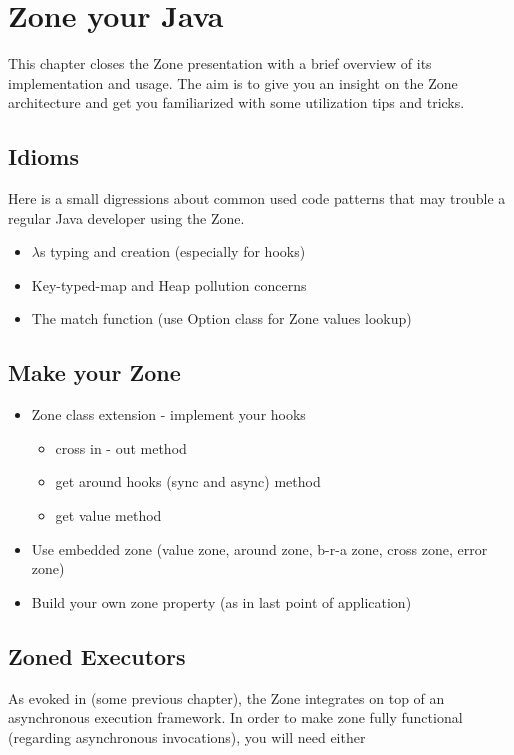 
\chapter{Zone your Java}
\label{ch:impl}

This chapter closes the Zone presentation with a brief overview of its implementation and usage.
The aim is to give you an insight on the Zone architecture and get you familiarized with some utilization tips and tricks.

\section{Idioms}

Here is a small digressions about common used code patterns that may trouble a regular Java developer using the Zone.

\begin{itemize}
\item $\lambda$s typing and creation (especially for hooks)
\item Key-typed-map and Heap pollution concerns
\item The match function (use Option class for Zone values lookup)
\end{itemize}

\section{Make your Zone}

\begin{itemize}
\item Zone class extension - implement your hooks
  \begin{itemize}
  \item cross in - out method
  \item get around hooks (sync and async) method
  \item get value method
  \end{itemize}
\item Use embedded zone (value zone, around zone, b-r-a zone, cross zone, error zone)
\item Build your own zone property (as in last point of application)
\end{itemize}


\section{Zoned Executors}

As evoked in (some previous chapter), the Zone integrates on top of an asynchronous execution framework. In order to make zone fully functional (regarding asynchronous invocations), you will need either

